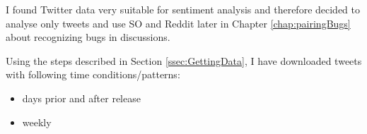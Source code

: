 I found Twitter data very suitable for sentiment analysis and therefore decided to analyse only tweets and use SO and Reddit later in Chapter \ref{chap:pairingBugs}  about recognizing bugs in discussions.

Using the steps described in Section \ref{ssec:GettingData}, I have downloaded tweets with following time conditions/patterns:
\begin{itemize}
\item days prior and after release
\item weekly
\end{itemize}

